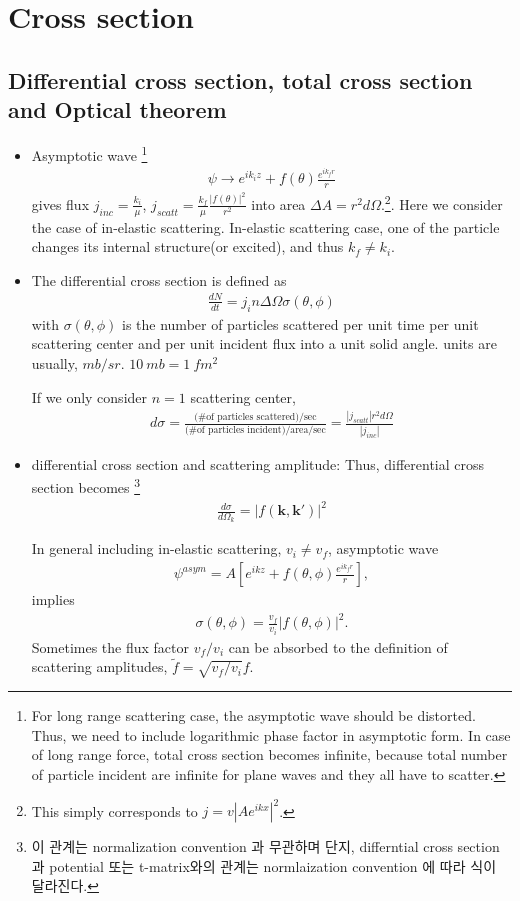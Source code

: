 \documentclass[10pt]{book}
\def\bm{\boldsymbol}
\newcommand{\bea}{\begin{eqnarray}}
\newcommand{\eea}{\end{eqnarray}}
\def\vk{{\bm k}}
\begin{document}
\section{Cross section}
\subsection{Differential cross section, total cross section and
 Optical theorem}
\begin{itemize}
\item Asymptotic wave \footnote{
For long range scattering case, the asymptotic wave should be
distorted. Thus, we need to include logarithmic phase factor
in asymptotic form. In case of long range force,
total cross section becomes infinite, because
total number of particle incident are infinite for
plane waves and they all have to scatter.
}
\bea
\psi\to e^{ik_i z}+f(\theta)\frac{e^{ik_f r}}{r}
\eea
gives flux $j_{inc}=\frac{k_i}{\mu}$, 
$j_{scatt}=\frac{k_f}{\mu}\frac{|f(\theta)|^2}{r^2}$
into area $\Delta A=r^2 d\Omega$.\footnote{
This simply corresponds to $j=v|A e^{ikx}|^2$.
}. Here we consider the case of in-elastic scattering.
In-elastic scattering case, one of the particle changes
its internal structure(or excited), and thus $k_f\neq k_i$.

\item The differential cross section is defined as
\bea
\frac{dN}{dt}=j_i n\Delta\Omega\sigma(\theta,\phi)
\eea
with $\sigma(\theta,\phi)$ is the number of particles scattered 
per unit time per unit scattering center and per unit incident flux
into a unit solid angle. units are usually, $mb/sr$. $10\ mb=1\ fm^2$

If we only consider $n=1$ scattering center,
\bea
d\sigma
=\frac{\mbox{(\# of particles scattered)/sec}}
    {\mbox{(\# of particles incident)/area/sec}}
=\frac{|j_{scatt}| r^2 d \Omega}{|j_{inc}|}    
\eea

\item differential cross section and scattering amplitude:
Thus,
differential cross section becomes 
\footnote{
이 관계는 normalization convention 과 무관하며
단지, differntial cross section과 potential 또는 t-matrix와의
관계는 normlaization convention 에 따라 식이 달라진다.}\bea
\frac{d\sigma}{d\Omega_k}=|f(\vk,\vk')|^2
\eea

In general including in-elastic scattering, $v_i\neq v_f$, asymptotic wave
\bea
\psi^{asym}=A[e^{ikz}+f(\theta,\phi)\frac{e^{ik_f r}}{r}],
\eea
implies
\bea
\sigma(\theta,\phi)=\frac{v_f}{v_i}|f(\theta,\phi)|^2.
\eea
Sometimes the flux factor $v_f/v_i$ can be absorbed to 
the definition of scattering amplitudes, $\tilde{f}=\sqrt{v_f/v_i} f$.


\end{itemize}
\end{document}
